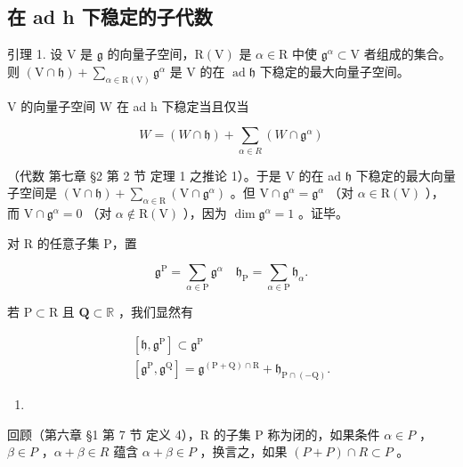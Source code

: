\subsection{在 ad h 下稳定的子代数}

引理 1. 设 \(\mathrm{V}\) 是 \(\mathfrak{g}\) 的向量子空间，\(\mathrm{R(V)}\) 是 \(\alpha \in \mathrm{R}\) 中使 \(\mathfrak{g}^{\alpha} \subset \mathrm{V}\) 者组成的集合。则 \((\mathrm{V} \cap \mathfrak{h}) + \sum_{\alpha \in \mathrm{R(V)}} \mathfrak{g}^{\alpha}\) 是 \(\mathrm{V}\) 的在 \(\operatorname{ad} \mathfrak{h}\) 下稳定的最大向量子空间。

V 的向量子空间 W 在 ad h 下稳定当且仅当

\[
W = (W \cap \mathfrak {h}) + \sum_ {\alpha \in R} (W \cap \mathfrak {g} ^ {\alpha})
\]

（代数 第七章 §2 第 2 节 定理 1 之推论 1）。于是 V 的在 ad \(\mathfrak{h}\) 下稳定的最大向量子空间是 \((\mathrm{V} \cap \mathfrak{h}) + \sum_{\alpha \in \mathrm{R}} (\mathrm{V} \cap \mathfrak{g}^{\alpha})\) 。但 \(\mathrm{V} \cap \mathfrak{g}^{\alpha} = \mathfrak{g}^{\alpha}\) （对 \(\alpha \in \mathrm{R}(\mathrm{V})\) ），而 \(\mathrm{V} \cap \mathfrak{g}^{\alpha} = 0\) （对 \(\alpha \notin \mathrm{R}(\mathrm{V})\) ），因为 \(\dim \mathfrak{g}^{\alpha} = 1\) 。证毕。

对 R 的任意子集 P，置

\[
\mathfrak {g} ^ {\mathrm{P}} = \sum_ {\alpha \in \mathrm{P}} \mathfrak {g} ^ {\alpha} \quad \mathfrak {h} _ {\mathrm{P}} = \sum_ {\alpha \in \mathrm{P}} \mathfrak {h} _ {\alpha}.
\]

若 \(\mathrm{P}\subset \mathrm{R}\) 且 \(\mathbf{Q}\subset \mathbb{R}\) ，我们显然有

\[
\begin{array}{c} {[ \mathfrak {h}, \mathfrak {g} ^ {\mathrm{P}} ] \subset \mathfrak {g} ^ {\mathrm{P}}} \\ {[ \mathfrak {g} ^ {\mathrm{P}}, \mathfrak {g} ^ {\mathrm{Q}} ] = \mathfrak {g} ^ {(\mathrm{P+Q}) \cap \mathrm{R}} + \mathfrak {h} _ {\mathrm{P} \cap (- \mathrm{Q})}.} \end{array}\tag{1}
\]

\begin{enumerate}
\def\labelenumi{(\arabic{enumi})}
\setcounter{enumi}{1}
\tightlist
\item
\end{enumerate}

回顾（第六章 §1 第 7 节 定义 4），R 的子集 P 称为闭的，如果条件 \(\alpha \in P\) ，\(\beta \in P\) ，\(\alpha + \beta \in R\) 蕴含 \(\alpha + \beta \in P\) ，换言之，如果 \((P + P) \cap R \subset P\) 。

